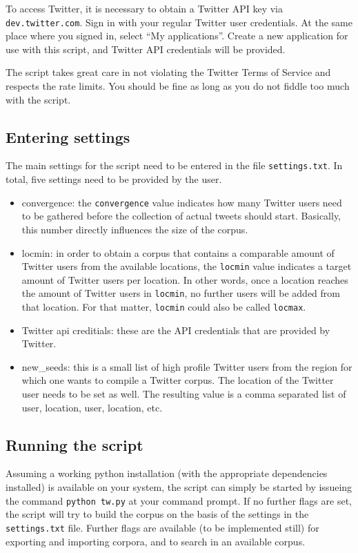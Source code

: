 \documentclass[a4paper,11pt]{article}
\begin{document}
To access Twitter, it is necessary to obtain a Twitter API key via \texttt{dev.twitter.com}. Sign in with your regular Twitter user credentials. At the same place where you signed in, select ``My applications''. Create a new application for use with this script, and Twitter API credentials will be provided.

The script takes great care in not violating the Twitter Terms of Service and respects the rate limits. You should be fine as long as you do not fiddle too much with the script.

\subsection{Entering settings}

The main settings for the script need to be entered in the file \texttt{settings.txt}. In total, five settings need to be provided by the user.

\begin{itemize}
  \item convergence: the \texttt{convergence} value indicates how many Twitter users need to be gathered before the collection of actual tweets should start. Basically, this number directly influences the size of the corpus.
  \item locmin: in order to obtain a corpus that contains a comparable amount of Twitter users from the available locations, the \texttt{locmin} value indicates a target amount of Twitter users per location. In other words, once a location reaches the amount of Twitter users in \texttt{locmin}, no further users will be added from that location. For that matter, \texttt{locmin} could also be called \texttt{locmax}.
  \item Twitter api creditials: these are the API credentials that are provided by Twitter.
  \item new\_seeds: this is a small list of high profile Twitter users from the region for which one wants to compile a Twitter corpus. The location of the Twitter user needs to be set as well. The resulting value is a comma separated list of user, location, user, location, etc.
\end{itemize}

\subsection{Running the script}

Assuming a working python installation (with the appropriate dependencies installed) is available on your system, the script can simply be started by issueing the command \texttt{python tw.py} at your command prompt. If no further flags are set, the script will try to build the corpus on the basis of the settings in the \texttt{settings.txt} file. Further flags are available (to be implemented still) for exporting and importing corpora, and to search in an available corpus.
\end{document}
